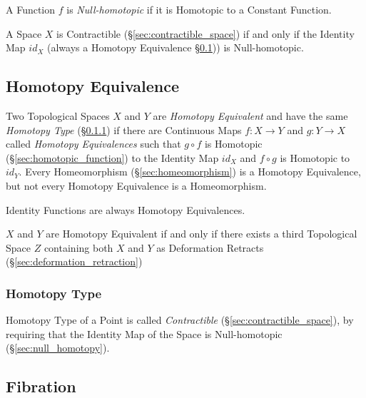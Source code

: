 A Function $f$ is \emph{Null-homotopic} if it is Homotopic to a
Constant Function.

A Space $X$ is Contractible (\S\ref{sec:contractible_space}) if and
only if the Identity Map $id_X$ (always a Homotopy Equivalence
\S\ref{sec:homotopy_equivalence})) is Null-homotopic.



\subsection{Homotopy Equivalence}\label{sec:homotopy_equivalence}

Two Topological Spaces $X$ and $Y$ are \emph{Homotopy Equivalent} and
have the same \emph{Homotopy Type} (\S\ref{sec:homotopy_type}) if
there are Continuous Maps $f : X \rightarrow Y$ and $g : Y \rightarrow
X$ called \emph{Homotopy Equivalences} such that $g \circ f$ is
Homotopic (\S\ref{sec:homotopic_function}) to the Identity Map $id_X$
and $f \circ g$ is Homotopic to $id_Y$. Every Homeomorphism
(\S\ref{sec:homeomorphism}) is a Homotopy Equivalence, but not every
Homotopy Equivalence is a Homeomorphism.

Identity Functions are always Homotopy Equivalences. %

$X$ and $Y$ are Homotopy Equivalent if and only if there exists a
third Topological Space $Z$ containing both $X$ and $Y$ as Deformation
Retracts (\S\ref{sec:deformation_retraction})



\subsubsection{Homotopy Type}\label{sec:homotopy_type}

Homotopy Type of a Point is called \emph{Contractible}
(\S\ref{sec:contractible_space}), by requiring that the Identity Map
of the Space is Null-homotopic (\S\ref{sec:null_homotopy}).



\subsection{Fibration}\label{sec:fibration}

